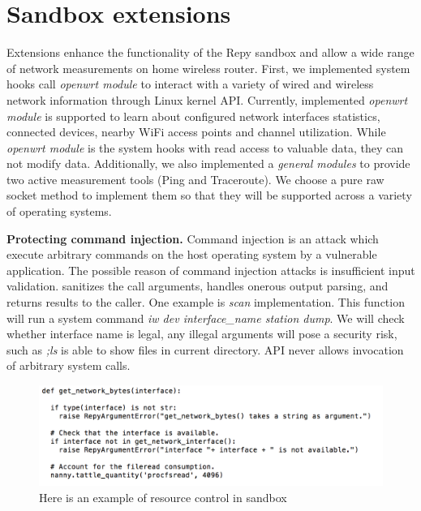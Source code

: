 \section{Sandbox extensions}
\label{sec.extensions}
Extensions enhance the functionality of the Repy sandbox and allow a wide range of network measurements on home wireless router. First, we implemented system hooks call \textit{openwrt module} to interact with a variety of wired and wireless network information through Linux kernel API. Currently, implemented \textit{openwrt module} is supported to learn about configured network interfaces statistics, connected devices, nearby WiFi access points and channel utilization. While \textit{openwrt module} is the system hooks with read access to valuable data, they can not modify data. Additionally, we also implemented a \textit{general modules} to provide two active measurement tools (Ping and Traceroute). We choose a pure raw socket method to implement them so that they will be supported across a variety of operating systems. 

\textbf{Protecting command injection.} Command injection is an attack which execute arbitrary commands on the host operating system by a vulnerable application. The possible reason of command injection attacks is insufficient input validation. \sysname sanitizes the call arguments, handles onerous output parsing, and returns results to the caller. One example is \textit{scan} implementation. This function will run a system command \textit{iw dev interface\_name station dump}. We will check whether interface name is legal, any illegal arguments will pose a security risk, such as \textit{;ls} is able to show files in current directory. \sysname API never allows invocation of arbitrary system calls.

\begin{figure}%
\centering
\includegraphics[width=0.8\columnwidth]{figure/nanny.png}
\caption{Here is an example of resource control in \sysname sandbox}
\label{fig-nanny}
\end{figure}

